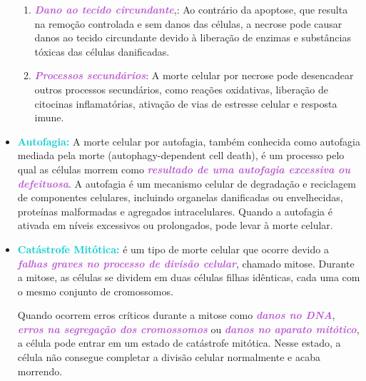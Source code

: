 \documentclass[11pt,a4paper]{article}
\begin{document}
\begin{itemize}
\begin{enumerate}
				\item \textcolor{MediumOrchid}{\textbf{\textit{Dano ao tecido circundante}}},: Ao contrário da apoptose, que resulta na remoção controlada e sem danos das células, a necrose pode causar danos ao tecido circundante devido à liberação de enzimas e substâncias tóxicas das células danificadas.
				
				\item \textcolor{MediumOrchid}{\textbf{\textit{Processos secundários}}}: A morte celular por necrose pode desencadear outros processos secundários, como reações oxidativas, liberação de citocinas inflamatórias, ativação de vias de estresse celular e resposta imune.
			\end{enumerate}

		\item \textcolor{DarkTurquoise}{\textbf{Autofagia:}} A morte celular por autofagia, também conhecida como autofagia mediada pela morte (autophagy-dependent cell death), é um processo pelo qual as células morrem como \textcolor{MediumOrchid}{\textbf{\textit{resultado de uma autofagia excessiva ou defeituosa}}}. A autofagia é um mecanismo celular de degradação e reciclagem de componentes celulares, incluindo organelas danificadas ou envelhecidas, proteínas malformadas e agregados intracelulares. Quando a autofagia é ativada em níveis excessivos ou prolongados, pode levar à morte celular.
		\item \textcolor{DarkTurquoise}{\textbf{Catástrofe Mitótica:}} é um tipo de morte celular que ocorre devido a \textcolor{MediumOrchid}{\textbf{\textit{falhas graves no processo de divisão celular}}}, chamado mitose. Durante a mitose, as células se dividem em duas células filhas idênticas, cada uma com o mesmo conjunto de cromossomos.

		Quando ocorrem erros críticos durante a mitose como \textcolor{MediumOrchid}{\textbf{\textit{danos no DNA}}}, \textcolor{MediumOrchid}{\textbf{\textit{erros na segregação dos cromossomos}}} ou \textcolor{MediumOrchid}{\textbf{\textit{danos no aparato mitótico}}}, a célula pode entrar em um estado de catástrofe mitótica. Nesse estado, a célula não consegue completar a divisão celular normalmente e acaba morrendo.
		

\end{itemize}
\end{document}
